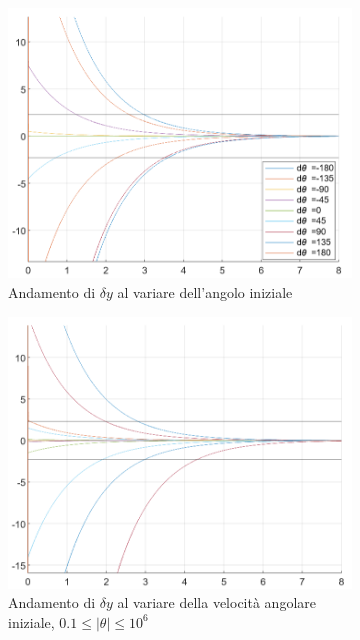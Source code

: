 \documentclass[a4paper, 11pt]{article}
\begin{document}
\begin{figure}[h!]
	\centering
	\begin{subfigure}[b]{0.4\textwidth}
		\centering
		\includegraphics[width=\textwidth]{./images/theta_iniziali.png}
		\caption{Andamento di $\delta y$ al variare dell'angolo iniziale}
		\label{fig:theta_iniziali}
	\end{subfigure}
	\begin{subfigure}[b]{0.4\textwidth}
		\centering
		\includegraphics[width=\textwidth]{./images/omega_iniziali.png}
		\caption{Andamento di $\delta y$ al variare della velocità angolare iniziale, $0.1 \le \lvert\theta\rvert \le 10^6$}
		\label{fig:omega_iniziali}
	\end{subfigure}
	
	\caption{}
	\label{fig:stato_iniziale}
\end{figure}
\end{document}
